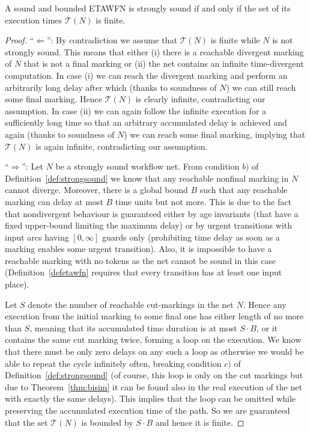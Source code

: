 \begin{lemma} \label{lem:finite}
A sound and bounded ETAWFN is strongly sound if and only if
the set of its execution times $\mathcal{T}(N)$ is finite.
\end{lemma}
\begin{proof}
``$\Leftarrow$'': By contradiction we assume that $\mathcal{T}(N)$
is finite while $N$ is not strongly sound. This means that either
(i) there is a reachable divergent marking of $N$ that is not a final marking
or (ii) the net contains an infinite time-divergent computation.
In case (i) we can reach the divergent marking and perform an
arbitrarily long delay after which (thanks to soundness of $N$)
we can still reach some final marking. Hence $\mathcal{T}(N)$ is
clearly infinite, contradicting our assumption. In case (ii)
we can again follow the infinite execution for a sufficiently long time so that
an arbitrary accumulated delay is achieved and again (thanks to soundness
of $N$) we can reach some final marking, implying that
$\mathcal{T}(N)$ is again infinite, contradicting our assumption.

``$\Rightarrow$'': Let $N$ be a strongly sound workflow net.
From condition $b)$ of Definition~\ref{def:strongsound}
we know that any reachable nonfinal marking
in $N$ cannot diverge. Moreover, there is a global bound $B$ such
that any reachable marking can delay at most $B$ time units but not more.
This is due to the fact that nondivergent behaviour is guaranteed either
by age invariants (that have a fixed upper-bound limiting the maximum
delay) or by urgent transitions with input arcs having $[0,\infty]$ guards
only (prohibiting time delay as soon as a marking enables some urgent
transition).
 Also, it is impossible to have a reachable marking with
no tokens as the net cannot be sound in this case (Definition~\ref{defetawfn}
requires that every transition has at least one input place).

Let $S$ denote the number of reachable cut-markings
in the net $N$.
Hence any execution from the initial marking to some final one has either
length of no more than $S$, meaning that its accumulated time duration
is at most $S\cdot B$, or it contains the same cut marking twice, forming a loop
on the execution.
We know that there must be only zero delays on
any such a loop as otherwise we would be able to repeat the cycle
infinitely often, breaking condition $c)$ of Definition~\ref{def:strongsound}
(of course, this loop is only on the cut markings but due to
Theorem~\ref{thm:bisim} it can be found also in the real execution of the net
with exactly the same delays).
This implies that the loop can be omitted while preserving
the accumulated execution time of the path.
So we are guaranteed that the set $\mathcal{T}(N)$ is bounded by $S\cdot B$
and hence it is finite.
\end{proof}



